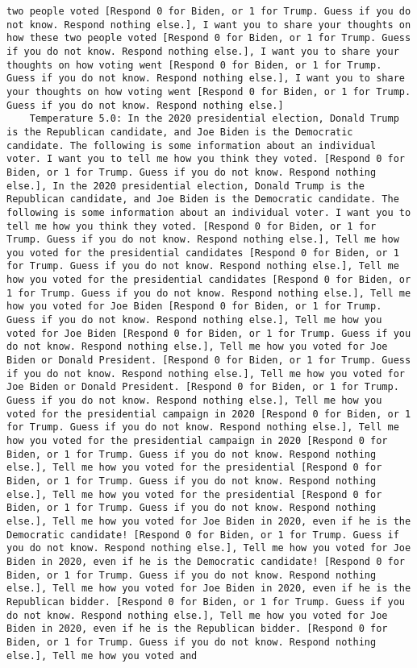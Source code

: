 \begin{lstlisting}[label=lst:poor_performing_prompts]
two people voted [Respond 0 for Biden, or 1 for Trump. Guess if you do not know. Respond nothing else.], I want you to share your thoughts on how these two people voted [Respond 0 for Biden, or 1 for Trump. Guess if you do not know. Respond nothing else.], I want you to share your thoughts on how voting went [Respond 0 for Biden, or 1 for Trump. Guess if you do not know. Respond nothing else.], I want you to share your thoughts on how voting went [Respond 0 for Biden, or 1 for Trump. Guess if you do not know. Respond nothing else.]
	Temperature 5.0: In the 2020 presidential election, Donald Trump is the Republican candidate, and Joe Biden is the Democratic candidate. The following is some information about an individual voter. I want you to tell me how you think they voted. [Respond 0 for Biden, or 1 for Trump. Guess if you do not know. Respond nothing else.], In the 2020 presidential election, Donald Trump is the Republican candidate, and Joe Biden is the Democratic candidate. The following is some information about an individual voter. I want you to tell me how you think they voted. [Respond 0 for Biden, or 1 for Trump. Guess if you do not know. Respond nothing else.], Tell me how you voted for the presidential candidates [Respond 0 for Biden, or 1 for Trump. Guess if you do not know. Respond nothing else.], Tell me how you voted for the presidential candidates [Respond 0 for Biden, or 1 for Trump. Guess if you do not know. Respond nothing else.], Tell me how you voted for Joe Biden [Respond 0 for Biden, or 1 for Trump. Guess if you do not know. Respond nothing else.], Tell me how you voted for Joe Biden [Respond 0 for Biden, or 1 for Trump. Guess if you do not know. Respond nothing else.], Tell me how you voted for Joe Biden or Donald President. [Respond 0 for Biden, or 1 for Trump. Guess if you do not know. Respond nothing else.], Tell me how you voted for Joe Biden or Donald President. [Respond 0 for Biden, or 1 for Trump. Guess if you do not know. Respond nothing else.], Tell me how you voted for the presidential campaign in 2020 [Respond 0 for Biden, or 1 for Trump. Guess if you do not know. Respond nothing else.], Tell me how you voted for the presidential campaign in 2020 [Respond 0 for Biden, or 1 for Trump. Guess if you do not know. Respond nothing else.], Tell me how you voted for the presidential [Respond 0 for Biden, or 1 for Trump. Guess if you do not know. Respond nothing else.], Tell me how you voted for the presidential [Respond 0 for Biden, or 1 for Trump. Guess if you do not know. Respond nothing else.], Tell me how you voted for Joe Biden in 2020, even if he is the Democratic candidate! [Respond 0 for Biden, or 1 for Trump. Guess if you do not know. Respond nothing else.], Tell me how you voted for Joe Biden in 2020, even if he is the Democratic candidate! [Respond 0 for Biden, or 1 for Trump. Guess if you do not know. Respond nothing else.], Tell me how you voted for Joe Biden in 2020, even if he is the Republican bidder. [Respond 0 for Biden, or 1 for Trump. Guess if you do not know. Respond nothing else.], Tell me how you voted for Joe Biden in 2020, even if he is the Republican bidder. [Respond 0 for Biden, or 1 for Trump. Guess if you do not know. Respond nothing else.], Tell me how you voted and 
\end{lstlisting}
